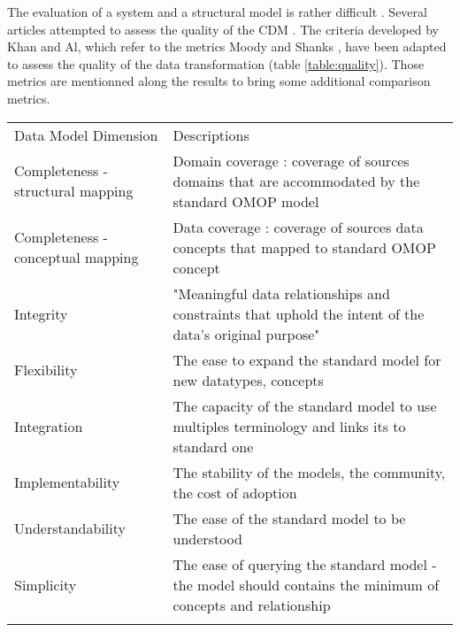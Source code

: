 
The evaluation of a system and a structural model is rather difficult
\cite{moody-quality}. Several articles attempted to assess the quality of the
CDM \cite{kahn-data-2012,omop-vs-pcornet}. The criteria developed by Khan and
Al\cite{kahn-quality}, which refer to the metrics Moody and Shanks
\cite{moody-quality}, have been adapted to assess the quality of the data
transformation (table \ref{table:quality}). Those metrics are mentionned along
the results to bring some additional comparison metrics.

\begin{table*}[t]
\caption{Transformation Quality Evaluation Metrics}
\begin{tabular}{lp{12cm}}\toprule
Data Model Dimension              & Descriptions                                                                                                      \\\colrule
Completeness - structural mapping & Domain coverage : coverage of sources domains that are accommodated by the standard OMOP model                    \\
Completeness - conceptual mapping & Data coverage : coverage of sources data concepts that mapped to standard OMOP concept                            \\
Integrity                         & "Meaningful data relationships and constraints that uphold the intent of the data's original purpose" \cite{kahn-quality} \\
Flexibility                       & The ease to expand the standard model for new datatypes, concepts                                                 \\
Integration                       & The capacity of the standard model to use multiples terminology and links its to standard one                     \\
Implementability                  & The stability of the models, the community, the cost of adoption                                                  \\
Understandability                 & The ease of the standard model to be understood                                                           	      \\
Simplicity                        & The ease of querying the standard model - the model should contains the minimum of concepts and relationship      \\\botrule 
\end{tabular}
\label{table:quality}
\end{table*}
\normalsize

